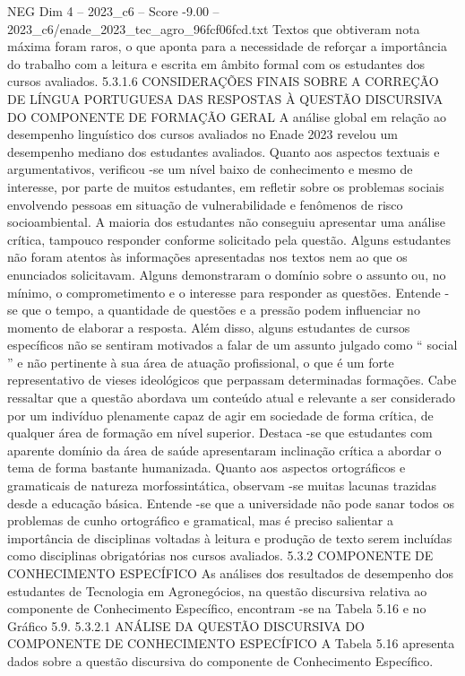 \begin{textsample}{NEG Dim 4 – 2023\_c6 – Score -9.00 – 2023\_c6/enade\_2023\_tec\_agro\_96fcf06fcd.txt}
Textos que obtiveram nota máxima foram raros, o que aponta para a necessidade de reforçar a importância do trabalho com a leitura e escrita em âmbito formal com os estudantes dos cursos avaliados. 5.3.1.6 CONSIDERAÇÕES FINAIS SOBRE A CORREÇÃO DE LÍNGUA PORTUGUESA DAS RESPOSTAS À QUESTÃO DISCURSIVA DO COMPONENTE DE FORMAÇÃO GERAL A análise global em relação ao desempenho linguístico dos cursos avaliados no Enade 2023 revelou um desempenho mediano dos estudantes avaliados.
Quanto aos aspectos textuais e argumentativos, verificou -se um nível baixo de conhecimento e mesmo de interesse, por parte de muitos estudantes, em refletir sobre os problemas sociais envolvendo pessoas em situação de vulnerabilidade e fenômenos de risco socioambiental.
A maioria dos estudantes não conseguiu apresentar uma análise crítica, tampouco responder conforme solicitado pela questão.
Alguns estudantes não foram atentos às informações apresentadas nos textos nem ao que os enunciados solicitavam.
Alguns demonstraram o domínio sobre o assunto ou, no mínimo, o comprometimento e o interesse para responder as questões.
Entende -se que o tempo, a quantidade de questões e a pressão podem influenciar no momento de elaborar a resposta.
Além disso, alguns estudantes de cursos específicos não se sentiram motivados a falar de um assunto julgado como “ social ” e não pertinente à sua área de atuação profissional, o que é um forte representativo de vieses ideológicos que perpassam determinadas formações.
Cabe ressaltar que a questão abordava um conteúdo atual e relevante a ser considerado por um indivíduo plenamente capaz de agir em sociedade de forma crítica, de qualquer área de formação em nível superior.
Destaca -se que estudantes com aparente domínio da área de saúde apresentaram inclinação crítica a abordar o tema de forma bastante humanizada.
Quanto aos aspectos ortográficos e gramaticais de natureza morfossintática, observam -se muitas lacunas trazidas desde a educação básica.
Entende -se que a universidade não pode sanar todos os problemas de cunho ortográfico e gramatical, mas é preciso salientar a importância de disciplinas voltadas à leitura e produção de texto serem incluídas como disciplinas obrigatórias nos cursos avaliados. 5.3.2 COMPONENTE DE CONHECIMENTO ESPECÍFICO As análises dos resultados de desempenho dos estudantes de Tecnologia em Agronegócios, na questão discursiva relativa ao componente de Conhecimento Específico, encontram -se na Tabela 5.16 e no Gráfico 5.9. 5.3.2.1 ANÁLISE DA QUESTÃO DISCURSIVA DO COMPONENTE DE CONHECIMENTO ESPECÍFICO A Tabela 5.16 apresenta dados sobre a questão discursiva do componente de Conhecimento Específico.

\end{textsample}
